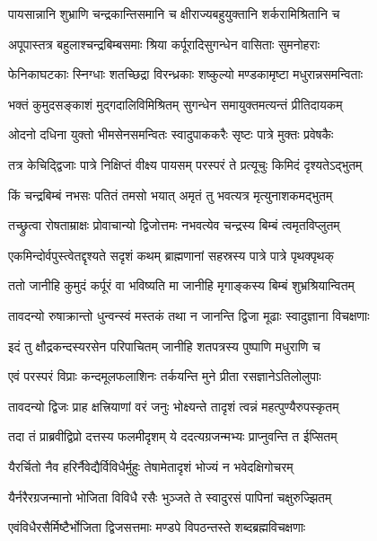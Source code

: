 \twolineshloka
{पायसान्नानि शुभ्राणि चन्द्रकान्तिसमानि च}
{क्षीराज्यबहुयुक्तानि शर्करामिश्रितानि च}%

\twolineshloka
{अपूपास्तत्र बहुलाश्चन्द्रबिम्बसमाः श्रिया}
{कर्पूरादिसुगन्धेन वासिताः सुमनोहराः}%

\twolineshloka
{फेनिकाघटकाः स्निग्धाः शतच्छिद्रा विरन्ध्रकाः}
{शष्कुल्यो मण्डकामृष्टा मधुरान्नसमन्विताः}%

\twolineshloka
{भक्तं कुमुदसङ्काशं मुद्गदालिविमिश्रितम्}
{सुगन्धेन समायुक्तमत्यन्तं प्रीतिदायकम्}%

\twolineshloka
{ओदनो दधिना युक्तो भीमसेनसमन्वितः}
{स्वादुपाककरैः सृष्टः पात्रे मुक्तः प्रवेषकैः}%

\twolineshloka
{तत्र केचिद्द्विजाः पात्रे निक्षिप्तं वीक्ष्य पायसम्}
{परस्परं ते प्रत्यूचुः किमिदं दृश्यतेऽद्भुतम्}%

\twolineshloka
{किं चन्द्रबिम्बं नभसः पतितं तमसो भयात्}
{अमृतं तु भवत्यत्र मृत्युनाशकमद्भुतम्}%

\twolineshloka
{तच्छ्रुत्वा रोषताम्राक्षः प्रोवाचान्यो द्विजोत्तमः}
{नभवत्येव चन्द्रस्य बिम्बं त्वमृतविप्लुतम्}%

\twolineshloka
{एकमिन्दोर्वपुस्त्वेतद्दृश्यते सदृशं कथम्}
{ब्राह्मणानां सहस्रस्य पात्रे पात्रे पृथक्पृथक्}%

\twolineshloka
{ततो जानीहि कुमुदं कर्पूरं वा भविष्यति}
{मा जानीहि मृगाङ्कस्य बिम्बं शुभ्रश्रियान्वितम्}%

\twolineshloka
{तावदन्यो रुषाक्रान्तो धुन्वन्स्वं मस्तकं तथा}
{न जानन्ति द्विजा मूढाः स्वादुज्ञाना विचक्षणाः}%

\twolineshloka
{इदं तु क्षौद्रकन्दस्यरसेन परिपाचितम्}
{जानीहि शतपत्रस्य पुष्पाणि मधुराणि च}%

\twolineshloka
{एवं परस्परं विप्राः कन्दमूलफलाशिनः}
{तर्कयन्ति मुने प्रीता रसज्ञानेऽतिलोलुपाः}%

\twolineshloka
{तावदन्यो द्विजः प्राह क्षत्त्रियाणां वरं जनुः}
{भोक्ष्यन्ते तादृशं त्वन्नं महत्पुण्यैरुपस्कृतम्}%

\twolineshloka
{तदा तं प्राब्रवीद्विप्रो दत्तस्य फलमीदृशम्}
{ये ददत्यग्रजन्मभ्यः प्राप्नुवन्ति त ईप्सितम्}%

\twolineshloka
{यैरर्चितो नैव हरिर्नैवेद्यैर्विविधैर्मुहुः}
{तेषामेतादृशं भोज्यं न भवेदक्षिगोचरम्}%

\twolineshloka
{यैर्नरैरग्रजन्मानो भोजिता विविधै रसैः}
{भुञ्जते ते स्वादुरसं पापिनां चक्षुरुज्झितम्}%

\twolineshloka
{एवंविधैरसैर्मिष्टैर्भोजिता द्विजसत्तमाः}
{मण्डपे विपठन्तस्ते शब्दब्रह्मविचक्षणाः}%

